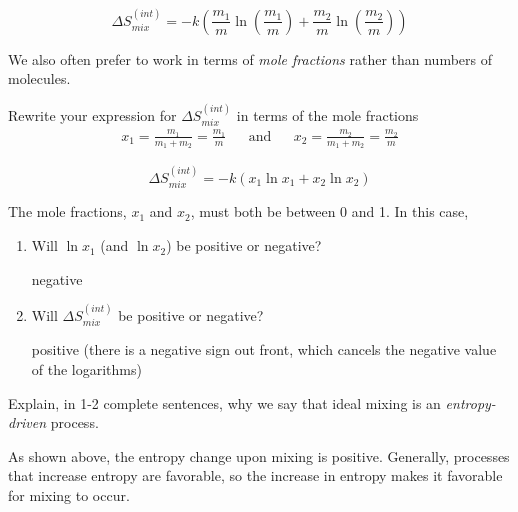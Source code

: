\begin{activity}
\begin{ctqs}
\begin{solution}[1in]
				\begin{equation*}
					\Delta S_{mix}^{(int)} = -k\left(\frac{m_1}{m} \ln\left(\frac{m_1}{m}\right) + \frac{m_2}{m} \ln\left(\frac{m_2}{m}\right) \right)
				\end{equation*}
			\end{solution}
		
	\question We also often prefer to work in terms of \emph{mole fractions} rather than numbers of molecules. \label{ctq:Smixed}
	
		Rewrite your expression for $\Delta S_{mix}^{(int)}$ in terms of the mole fractions
		\begin{align*}
			x_1 = \frac{m_1}{m_1 + m_2} = \frac{m_1}{m} && \text{and} && x_2 = \frac{m_2}{m_1+m_2} = \frac{m_2}{m}
		\end{align*}
		
			\begin{solution}[0.75in]
			
				\begin{equation*}
					\Delta S_{mix}^{(int)} = -k\left(x_1 \ln x_1 + x_2 \ln x_2 \right)
				\end{equation*}
			\end{solution}
		
	\question The mole fractions, $x_1$ and $x_2$, must both be between 0 and 1.  In this case,
		\begin{enumerate}
			\item Will $\ln x_1$ (and $\ln x_2$) be positive or negative?
	
				\begin{solution}[1in]
					negative
				\end{solution}
				
			\item Will $\Delta S_{mix}^{(int)}$ be positive or negative? \label{ctq:Spositive}
	
				\begin{solution}[1in]
					positive (there is a negative sign out front, which cancels the negative value of the logarithms)
				\end{solution}
				
		\end{enumerate}
		
	\question Explain, in 1-2 complete sentences, why we say that ideal mixing is an \emph{entropy-driven} process.
	
		\begin{solution}[2.5in]
		
			As shown above, the entropy change upon mixing is positive.  Generally, processes that increase entropy are favorable, so the increase in entropy makes it favorable for mixing to occur.
			

\end{solution}
\end{ctqs}
\end{activity}
